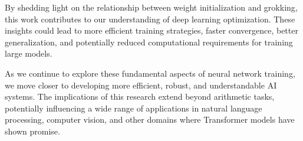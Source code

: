 \documentclass{article} %
\begin{document}
By shedding light on the relationship between weight initialization and grokking, this work contributes to our understanding of deep learning optimization. These insights could lead to more efficient training strategies, faster convergence, better generalization, and potentially reduced computational requirements for training large models.

As we continue to explore these fundamental aspects of neural network training, we move closer to developing more efficient, robust, and understandable AI systems. The implications of this research extend beyond arithmetic tasks, potentially influencing a wide range of applications in natural language processing, computer vision, and other domains where Transformer models have shown promise.



\end{document}
